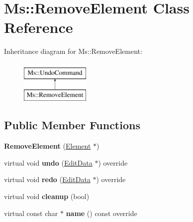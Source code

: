 \hypertarget{class_ms_1_1_remove_element}{}\section{Ms\+:\+:Remove\+Element Class Reference}
\label{class_ms_1_1_remove_element}
Inheritance diagram for Ms\+:\+:Remove\+Element\+:\begin{figure}[H]
\begin{center}
\leavevmode
\includegraphics[height=2.000000cm]{class_ms_1_1_remove_element}
\end{center}
\end{figure}
\subsection*{Public Member Functions}
\begin{DoxyCompactItemize}
\item 
\mbox{\label{class_ms_1_1_remove_element_ac4afb55f915155b04047e85d00726fa7}} 
{\bfseries Remove\+Element} (\hyperlink{class_ms_1_1_element}{Element} $\ast$)
\item 
\mbox{\label{class_ms_1_1_remove_element_a424f53c4df0ac7a004863a7c2947c6f4}} 
virtual void {\bfseries undo} (\hyperlink{class_ms_1_1_edit_data}{Edit\+Data} $\ast$) override
\item 
\mbox{\label{class_ms_1_1_remove_element_a7141f0c1c4ec888388d0e6326887e687}} 
virtual void {\bfseries redo} (\hyperlink{class_ms_1_1_edit_data}{Edit\+Data} $\ast$) override
\item 
\mbox{\label{class_ms_1_1_remove_element_a1b8619e851d6d59e94d967a8bdc0df23}} 
virtual void {\bfseries cleanup} (bool)
\item 
\mbox{\label{class_ms_1_1_remove_element_a45261e472b3646a2b99b1dbade4e0146}} 
virtual const char $\ast$ {\bfseries name} () const override
\end{DoxyCompactItemize}
